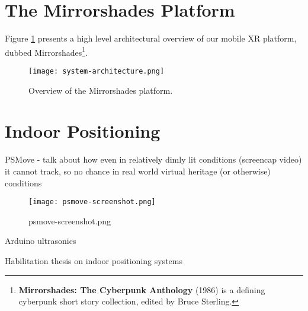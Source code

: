 

\section{The Mirrorshades Platform}
Figure \ref{systemarchitecture} presents a high level architectural overview of our mobile XR platform, dubbed Mirrorshades\footnote{\textbf{Mirrorshades: The Cyberpunk Anthology} (1986) is a defining cyberpunk short story collection, edited by Bruce Sterling.}.

\begin{figure}[h]
	\begin{center}
		\texttt{[image: system-architecture.png]}
		\caption{Overview of the Mirrorshades platform.}
		\label{systemarchitecture}
	\end{center}
\end{figure}


\section{Indoor Positioning}

PSMove - talk about how even in relatively dimly lit conditions (screencap video) it cannot track, so no chance in real world virtual heritage (or otherwise) conditions
	
\begin{figure}[h]
	\begin{center}
		\texttt{[image: psmove-screenshot.png]}
		\caption{psmove-screenshot.png}
		\label{psmove-screenshot.png}
	\end{center}
\end{figure}


Arduino ultrasonics

Habilitation thesis on indoor positioning systems\cite{Mautz2012}

